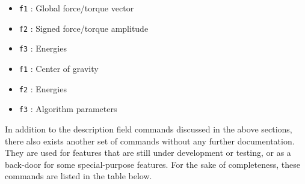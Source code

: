 

\begin{itemize}
\item{\tt f1} : Global force/torque vector
\item{\tt f2} : Signed force/torque amplitude
\item{\tt f3} : Energies
\end{itemize}




\begin{itemize}
\item{\tt f1} : Center of gravity
\item{\tt f2} : Energies
\item{\tt f3} : Algorithm parameters
\end{itemize}


\clearpage



In addition to the description field commands discussed in the above sections,
there also exists another set of commands without any further documentation.
They are used for features that are still under development or testing,
or as a back-door for some special-purpose features.
For the sake of completeness, these commands are listed in the table below.


